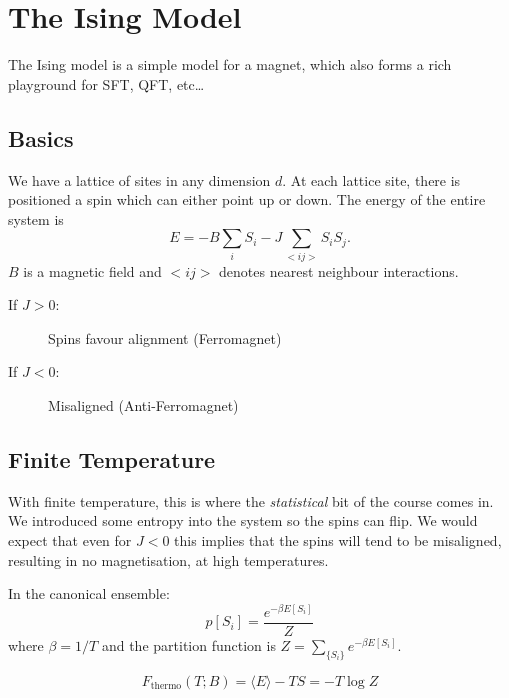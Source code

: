 \chapter{The Ising Model}%
\label{cha:the_ising_model}

The Ising model is a simple model for a magnet, which also forms a rich playground for SFT, QFT, etc\dots

\section{Basics}%
\label{sec:basics}

We have a lattice of sites in any dimension $d$. At each lattice site, there is positioned a spin which can either point up or down.
The energy of the entire system is
\begin{equation}
  E = -B \sum_i S_i - J \sum_{<ij>} S_i S_j.
\end{equation}
$B$ is a magnetic field and $<ij>$ denotes nearest neighbour interactions.
\begin{description}
  \item[If $J > 0$:] Spins favour alignment (Ferromagnet)
  \item[If $J < 0$:] Misaligned (Anti-Ferromagnet)
\end{description}

\section{Finite Temperature}%
\label{sec:finite_temperature}

With finite temperature, this is where the \emph{statistical} bit of the course comes in. We introduced some entropy into the system so the spins can flip. We would expect that even for $J < 0$ this implies that the spins will tend to be misaligned, resulting in no magnetisation, at high temperatures.

In the canonical ensemble:
\begin{equation}
  p[S_i] = \frac{e^{-\beta E[S_i]}}{Z}
\end{equation}
where $\beta = 1/T$ and the partition function is $Z = \sum_{\{S_i\}} e^{-\beta E [S_i]}$.

\begin{example}[]
  \begin{equation}
    F_{\text{thermo}} (T; B) = \langle E \rangle - TS = -T \log Z
  \end{equation}
\end{example}

